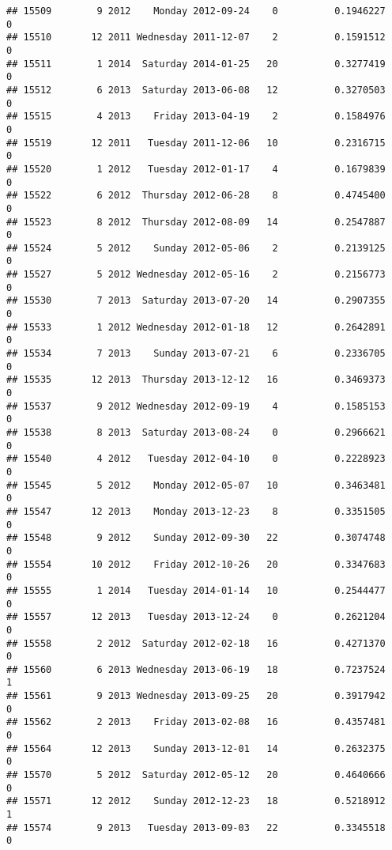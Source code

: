 \documentclass[
]{article}
\begin{document}
\begin{verbatim}
## 15509        9 2012    Monday 2012-09-24    0          0.1946227             0
## 15510       12 2011 Wednesday 2011-12-07    2          0.1591512             0
## 15511        1 2014  Saturday 2014-01-25   20          0.3277419             0
## 15512        6 2013  Saturday 2013-06-08   12          0.3270503             0
## 15515        4 2013    Friday 2013-04-19    2          0.1584976             0
## 15519       12 2011   Tuesday 2011-12-06   10          0.2316715             0
## 15520        1 2012   Tuesday 2012-01-17    4          0.1679839             0
## 15522        6 2012  Thursday 2012-06-28    8          0.4745400             0
## 15523        8 2012  Thursday 2012-08-09   14          0.2547887             0
## 15524        5 2012    Sunday 2012-05-06    2          0.2139125             0
## 15527        5 2012 Wednesday 2012-05-16    2          0.2156773             0
## 15530        7 2013  Saturday 2013-07-20   14          0.2907355             0
## 15533        1 2012 Wednesday 2012-01-18   12          0.2642891             0
## 15534        7 2013    Sunday 2013-07-21    6          0.2336705             0
## 15535       12 2013  Thursday 2013-12-12   16          0.3469373             0
## 15537        9 2012 Wednesday 2012-09-19    4          0.1585153             0
## 15538        8 2013  Saturday 2013-08-24    0          0.2966621             0
## 15540        4 2012   Tuesday 2012-04-10    0          0.2228923             0
## 15545        5 2012    Monday 2012-05-07   10          0.3463481             0
## 15547       12 2013    Monday 2013-12-23    8          0.3351505             0
## 15548        9 2012    Sunday 2012-09-30   22          0.3074748             0
## 15554       10 2012    Friday 2012-10-26   20          0.3347683             0
## 15555        1 2014   Tuesday 2014-01-14   10          0.2544477             0
## 15557       12 2013   Tuesday 2013-12-24    0          0.2621204             0
## 15558        2 2012  Saturday 2012-02-18   16          0.4271370             0
## 15560        6 2013 Wednesday 2013-06-19   18          0.7237524             1
## 15561        9 2013 Wednesday 2013-09-25   20          0.3917942             0
## 15562        2 2013    Friday 2013-02-08   16          0.4357481             0
## 15564       12 2013    Sunday 2013-12-01   14          0.2632375             0
## 15570        5 2012  Saturday 2012-05-12   20          0.4640666             0
## 15571       12 2012    Sunday 2012-12-23   18          0.5218912             1
## 15574        9 2013   Tuesday 2013-09-03   22          0.3345518             0

\end{verbatim}
\end{document}
